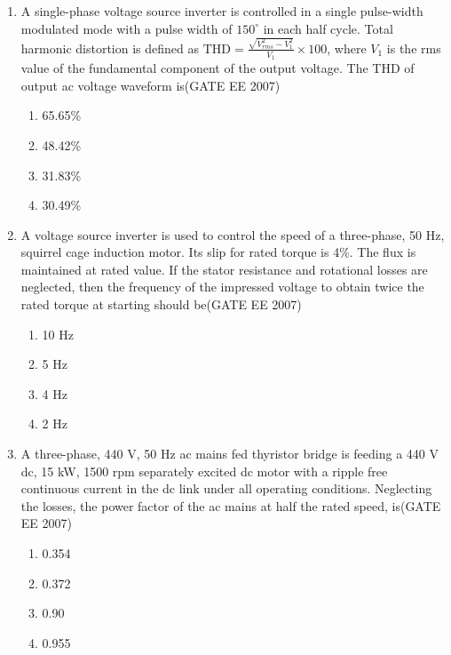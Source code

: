 \documentclass[a4paper,10pt]{exam}
\theoremstyle{remark}
\begin{document}
\begin{enumerate}
\item \quad A single-phase voltage source inverter is controlled in a single pulse-width modulated mode with a pulse width of $150^{\circ}$ in each half cycle. Total harmonic distortion is defined as $\text{THD} = \frac{\sqrt{V_{rms}^2 - V_1^2}}{V_1} \times 100$, where $V_1$ is the rms value of the fundamental component of the output voltage. The THD of output ac voltage waveform is\hfill{(GATE EE 2007)} 

\begin{multicols}{4}
\begin{enumerate}
    \item  65.65\%
 \item  48.42\%
 \item 31.83\%
 \item  30.49\%
\end{enumerate}
\end{multicols}

\item  \quad A voltage source inverter is used to control the speed of a three-phase, 50 Hz, squirrel cage induction motor. Its slip for rated torque is 4\%. The flux is maintained at rated value. If the stator resistance and rotational losses are neglected, then the frequency of the impressed voltage to obtain twice the rated torque at starting should be\hfill{(GATE EE 2007)} 

\begin{multicols}{4}
\begin{enumerate}
 \item  10 Hz
 \item  5 Hz
 \item  4 Hz
 \item  2 Hz
 \end{enumerate}
\end{multicols}

\item \quad A three-phase, 440 V, 50 Hz ac mains fed thyristor bridge is feeding a 440 V dc, 15 kW, 1500 rpm separately excited dc motor with a ripple free continuous current in the dc link under all operating conditions. Neglecting the losses, the power factor of the ac mains at half the rated speed, is\hfill{(GATE EE 2007)} 

\begin{multicols}{4}
\begin{enumerate}
 \item  0.354
 \item 0.372
 \item 0.90
 \item 0.955
 \end{enumerate}
\end{multicols}


\end{enumerate}
\end{document}
